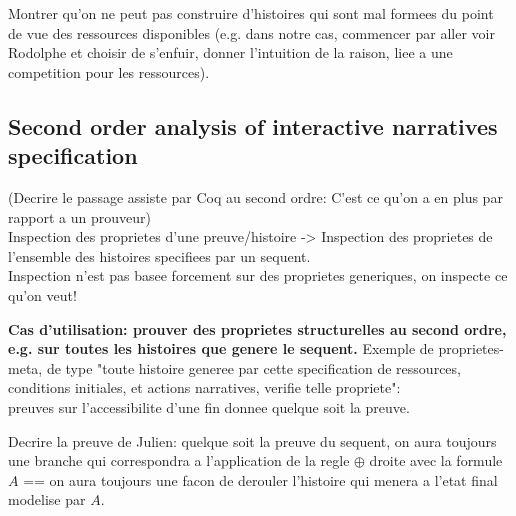 \documentclass[runningheads,a4paper]{llncs}
\begin{document}
Montrer qu'on ne peut pas construire d'histoires qui sont mal formees du point de vue des ressources disponibles (e.g. dans notre cas, commencer par aller voir Rodolphe et choisir de s'enfuir, donner l'intuition de la raison, liee a une competition pour les ressources).
\subsection{Second order analysis of interactive narratives specification}
\label{sec:second-order-analys}
(Decrire le passage assiste par Coq au second ordre: C'est ce qu'on a en plus par rapport a un prouveur)
\\
Inspection des proprietes d'une preuve/histoire -> Inspection des proprietes de l'ensemble des histoires specifiees par un sequent.\\
Inspection n'est pas basee forcement sur des proprietes generiques, on inspecte ce qu'on veut!

\textbf{Cas d'utilisation: prouver des proprietes structurelles au second ordre, e.g. sur toutes les histoires que genere le sequent.}
Exemple de proprietes-meta, de type "toute histoire generee par cette specification de ressources, conditions initiales, et actions narratives, verifie telle propriete":\\ preuves sur l'accessibilite d'une fin donnee quelque soit la preuve.

Decrire la preuve de Julien: quelque soit la preuve du sequent, on aura toujours une branche qui correspondra a l'application de la regle $\oplus$ droite avec la formule $A$ == on aura toujours une facon de derouler l'histoire qui menera a l'etat final modelise par $A$.
\end{document}
